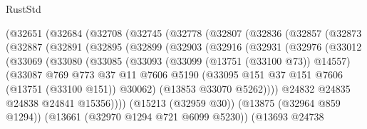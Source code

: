 \begin{lexlean}{RustStd}
\begin{coremodule}
            (@32651
              (@32684
                (@32708
                  (@32745
                    (@32778
                      (@32807
                        (@32836
                          (@32857
                            (@32873
                              (@32887
                                (@32891
                                  (@32895
                                    (@32899
                                      (@32903
                                        (@32916
                                          (@32931
                                            (@32976
                                              (@33012
                                                (@33069
                                                  (@33080
                                                    (@33085
                                                      (@33093
                                                        (@33099 (@13751 (@33100 @73)) @14557)
                                                        (@33087
                                                          @769
                                                          @773
                                                          @37
                                                          @11
                                                          @7606
                                                          @5190
                                                          (@33095
                                                            @151
                                                            @37
                                                            @151
                                                            @7606
                                                            (@13751 (@33100 @151))
                                                            @30062)
                                                          (@13853 @33070 @5262))))
                                                    @24832
                                                    @24835
                                                    @24838
                                                    @24841
                                                    @15356))))
                                            (@15213 (@32959 @30))
                                            (@13875 (@32964 @859 @1294))
                                            (@13661 (@32970 @1294 @721 @6099 @5230))
                                            (@13693
                                              @24738

\end{coremodule}
\end{lexlean}
